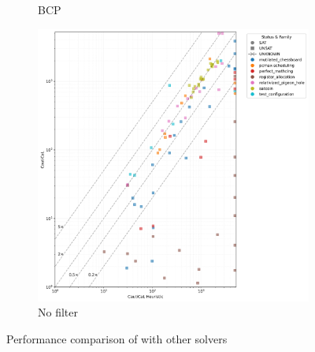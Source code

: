 \begin{figure}[!t]
\begin{subfigure}[t]{0.3\textwidth}
        \caption{BCP}
        \label{fig:globalbcp}
    \end{subfigure}
    \begin{subfigure}[t]{0.3\textwidth}
        \centering
        \includegraphics[width=\textwidth]{figs/globaldontfilter_heuristic_comparison.jpg}
        \caption{No filter}
        \label{fig:globaldontfilter}
    \end{subfigure}

    \caption{Performance comparison of \tool with other solvers}
\end{figure}

